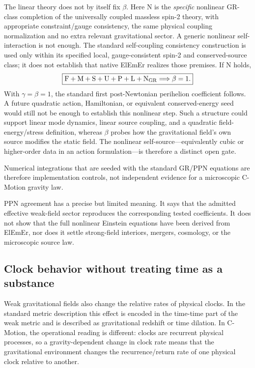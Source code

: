 \documentclass[11pt]{article}
\newcommand{\cmotion}{\mbox{C-Motion}}
\newcommand{\ElEmEr}{\mbox{ElEmEr}}
\theoremstyle{plain}
\theoremstyle{remark}
\begin{document}
The linear theory does not by itself fix $\beta$.  Here N is the
\emph{specific} nonlinear GR-class completion of the universally coupled
massless spin-2 theory, with appropriate constraint/gauge consistency, the
same physical coupling normalization and no extra relevant gravitational
sector.  A generic nonlinear self-interaction is not enough.  The standard
self-coupling consistency construction \cite{Deser1970SelfInteraction}
is used only within its specified local, gauge-consistent spin-2 and
conserved-source class; it does not establish that native \ElEmEr{}
realizes those premises.  If N holds,
\begin{equation}
\boxed{
\mathrm F+\mathrm M+\mathrm S+\mathrm U+\mathrm P+\mathrm L+\mathrm N_{\rm GR}
\Longrightarrow \beta=1.}
\label{eq:beta1}
\end{equation}
With $\gamma=\beta=1$, the standard first post-Newtonian perihelion coefficient follows.
A future quadratic action, Hamiltonian, or equivalent conserved-energy seed would still not
be enough to establish this nonlinear step.  Such a structure could support linear mode
dynamics, linear source coupling, and a quadratic field-energy/stress definition, whereas
$\beta$ probes how the gravitational field's own source modifies the static field.  The
nonlinear self-source---equivalently cubic or higher-order data in an action formulation---is
therefore a distinct open gate.

Numerical integrations that are seeded with the standard GR/PPN equations are therefore
implementation controls, not independent evidence for a microscopic \cmotion{} gravity
law.

PPN agreement has a precise but limited meaning.  It says that the admitted effective
weak-field sector reproduces the corresponding tested coefficients.  It does not show
that the full nonlinear Einstein equations have been derived from \ElEmEr{}, nor does it
settle strong-field interiors, mergers, cosmology, or the microscopic source law.

\subsection{Clock behavior without treating time as a substance}
\label{sec:clocks}

Weak gravitational fields also change the relative rates of physical clocks.  In the
standard metric description this effect is encoded in the time-time part of the weak
metric and is described as gravitational redshift or time dilation.  In \cmotion{}, the
operational reading is different: clocks are recurrent physical processes, so a
gravity-dependent change in clock rate means that the gravitational environment changes
the recurrence/return rate of one physical clock relative to another.
\end{document}
